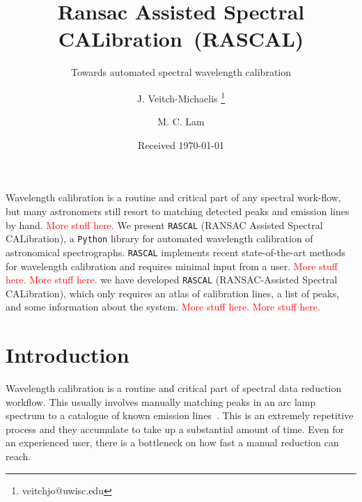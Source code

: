 \documentclass{aa}
\begin{document}
 

   \title{Ransac Assisted Spectral CALibration~(RASCAL)}

   \subtitle{Towards automated spectral wavelength calibration}

   \author{J. Veitch-Michaelis
          \fnmsep\thanks{veitchjo@uwisc.edu}
          \and
          M. C. Lam
          }


   \date{Received \today}

 
  \abstract
   {Wavelength calibration is a routine and critical part of any spectral work-flow, but many astronomers still resort to matching detected peaks and emission lines by hand. \textcolor{red}{More stuff here.}}
   {We present \texttt{RASCAL} (RANSAC Assisted Spectral CALibration), a \texttt{Python} library for automated wavelength calibration of astronomical spectrographs. \texttt{RASCAL} implements recent state-of-the-art methods for wavelength calibration and requires minimal input from a user. \textcolor{red}{More stuff here.}}
   { \textcolor{red}{More stuff here.}}
   {we have developed \texttt{RASCAL} (RANSAC-Assisted Spectral CALibration), which only requires an atlas of calibration lines, a list of peaks, and some information about the system. \textcolor{red}{More stuff here.}}
   { \textcolor{red}{More stuff here.}}


   \maketitle
%
\section{Introduction}
Wavelength calibration is a routine and critical part of spectral data reduction
workflow. This usually involves manually matching peaks in an arc lamp spectrum to a
catalogue of known emission lines~\citep{2010MNRAS.409.1601B}. This is an extremely
repetitive process and they accumulate to take up a substantial amount of time.
Even for an experienced user, there is a bottleneck on how fast a manual reduction
can reach.
\end{document}
